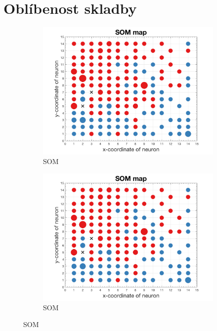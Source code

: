 \documentclass[thesis=M,czech]{FITthesis}[2012/06/26]
\begin{document}
\section{Oblíbenost skladby}\label{exp:hotfail}




\begin{figure}
\centering

\begin{subfigure}{.5\textwidth}
  \centering
  \includegraphics[width=1\linewidth]{exp_sexp_off_som.png}
  \caption{SOM}
  \label{fig:sub1}
\end{subfigure}%
\begin{subfigure}{.5\textwidth}
  \centering
  \includegraphics[width=1\linewidth]{exp_sexp_off_som.png}
  \caption{SOM}
  \label{fig:sub1}
\end{subfigure}%




\end{figure}
\end{document}
